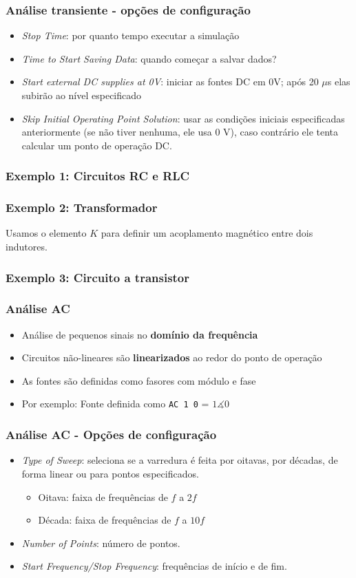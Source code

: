 \documentclass{beamer}
\begin{document}
\begin{frame}
\frametitle{Análise transiente - opções de configuração}
\begin{itemize} 
\item \textit{Stop Time}: por quanto tempo executar a simulação
\item \textit{Time to Start Saving Data}: quando começar a salvar dados?
\item \textit{Start external DC supplies at 0V}: iniciar as fontes DC em 0V; após 20 $\mu$s elas subirão ao nível especificado
\item \textit{Skip Initial Operating Point Solution}: usar as condições iniciais especificadas anteriormente (se não tiver nenhuma, ele usa 0 V), caso contrário ele tenta calcular um ponto de operação DC.
\end{itemize}
\end{frame}

\begin{frame}
\frametitle{Exemplo 1: Circuitos RC e RLC}
\end{frame}

\begin{frame}
\frametitle{Exemplo 2: Transformador}
Usamos o elemento $K$ para definir um acoplamento magnético entre dois indutores.
\end{frame}

\begin{frame}
\frametitle{Exemplo 3: Circuito a transistor}
\end{frame}


\begin{frame}
\frametitle{Análise AC}
\begin{itemize}
\item{Análise de pequenos sinais no \textbf{domínio da frequência}}
\item{Circuitos não-lineares são \textbf{linearizados} ao redor do ponto de operação}
\item{As fontes são definidas como fasores com módulo e fase}
\item{Por exemplo: Fonte definida como \texttt{AC 1 0} = $1\measuredangle 0$} 
\end{itemize}
\end{frame}

\begin{frame}
\frametitle{Análise AC - Opções de configuração}
\begin{itemize}
\item{\textit{Type of Sweep}}: seleciona se a varredura é feita por oitavas, por décadas, de forma linear ou para pontos especificados.
\begin{itemize}
\item{Oitava}: faixa de frequências de $f$ a $2 f$
\item{Década}: faixa de frequências de $f$ a $10 f$
\end{itemize}
\item{\textit{Number of Points}}: número de pontos.
\item{\textit{Start Frequency/Stop Frequency}}: frequências de início e de fim.
\end{itemize}
\end{frame}
\end{document}
